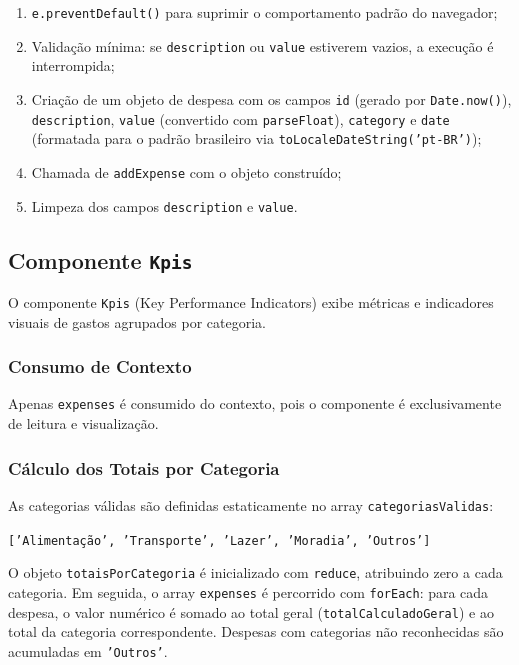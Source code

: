 \documentclass{article}
\begin{document}
\begin{enumerate}
  \item \texttt{e.preventDefault()} para suprimir o comportamento padrão do navegador;
  \item Validação mínima: se \texttt{description} ou \texttt{value} estiverem vazios, a execução é interrompida;
  \item Criação de um objeto de despesa com os campos \texttt{id} (gerado por \texttt{Date.now()}), \texttt{description}, \texttt{value} (convertido com \texttt{parseFloat}), \texttt{category} e \texttt{date} (formatada para o padrão brasileiro via \texttt{toLocaleDateString('pt-BR')});
  \item Chamada de \texttt{addExpense} com o objeto construído;
  \item Limpeza dos campos \texttt{description} e \texttt{value}.
\end{enumerate}

\subsection{Componente \texttt{Kpis}}

O componente \texttt{Kpis} (Key Performance Indicators) exibe métricas e indicadores visuais de gastos agrupados por categoria.

\subsubsection*{Consumo de Contexto}

Apenas \texttt{expenses} é consumido do contexto, pois o componente é exclusivamente de leitura e visualização.

\subsubsection*{Cálculo dos Totais por Categoria}

As categorias válidas são definidas estaticamente no array \texttt{categoriasValidas}:

\begin{center}
  \texttt{['Alimentação', 'Transporte', 'Lazer', 'Moradia', 'Outros']}
\end{center}

O objeto \texttt{totaisPorCategoria} é inicializado com \texttt{reduce}, atribuindo zero a cada categoria. Em seguida, o array \texttt{expenses} é percorrido com \texttt{forEach}: para cada despesa, o valor numérico é somado ao total geral (\texttt{totalCalculadoGeral}) e ao total da categoria correspondente. Despesas com categorias não reconhecidas são acumuladas em \texttt{'Outros'}.
\end{document}
